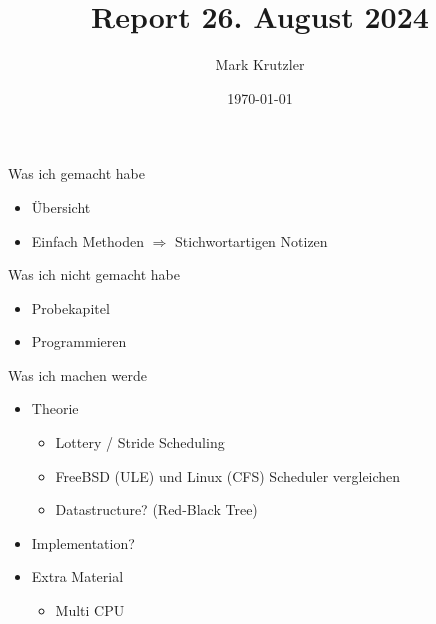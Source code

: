\documentclass[presentation]{beamer}
\author{Mark Krutzler}
\date{\today}
\title{Report 26. August 2024}
\begin{document}
\maketitle
\begin{frame}[label={sec:orgef68548}]{Was ich gemacht habe}
\begin{itemize}
\item Übersicht
\item Einfach Methoden
\(\Rightarrow\) Stichwortartigen Notizen
\end{itemize}
\end{frame}
\begin{frame}[label={sec:org907e916}]{Was ich nicht gemacht habe}
\begin{itemize}
\item Probekapitel
\item Programmieren
\end{itemize}
\end{frame}
\begin{frame}[label={sec:orgd3410ac}]{Was ich machen werde}
\begin{itemize}
\item Theorie
\begin{itemize}
\item Lottery / Stride Scheduling
\item FreeBSD (ULE) und Linux (CFS) Scheduler vergleichen
\item Datastructure? (Red-Black Tree)
\end{itemize}
\item Implementation?
\item Extra Material
\begin{itemize}
\item Multi CPU
\end{itemize}
\end{itemize}
\end{frame}
\end{document}
